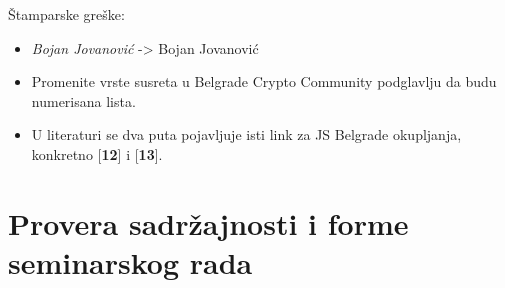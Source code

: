 \documentclass[a4paper]{report}
\begin{document}
Štamparske greške:\begin{itemize}
\item \textit{Bojan Jovanović} -> Bojan Jovanović
\item Promenite vrste susreta u Belgrade Crypto Community podglavlju da budu numerisana lista.
\item U literaturi se dva puta pojavljuje isti link za JS Belgrade okupljanja, konkretno
      [\textbf{12}] i [\textbf{13}].
\end{itemize}



\section{Provera sadržajnosti i forme seminarskog rada}
\end{document}
